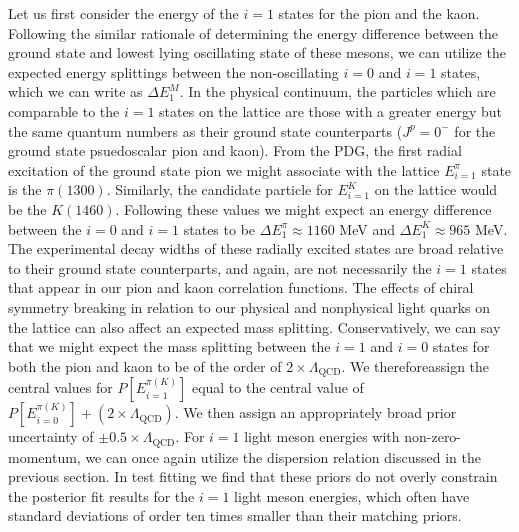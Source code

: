  Let us first consider the energy of the $i=1$ states for the pion and the kaon.  Following the similar rationale of determining the energy difference between the ground state and lowest lying oscillating state of these mesons, we can utilize the expected energy splittings between the non-oscillating $i=0$ and $i=1$ states, which we can write as $\Delta E^M_1$.   In the physical continuum, the particles which are comparable to the $i=1$ states on the lattice are those with a greater energy but the same quantum numbers as their ground state counterparts ($J^p = 0^-$ for the ground state psuedoscalar pion and kaon).  From the PDG, the first radial excitation of the ground state pion we might associate with the lattice $E^\pi_{i=1}$ state is the $\pi(1300)$.  Similarly, the candidate particle for $E^K_{i=1}$ on the lattice would be the $K(1460)$.  Following these values we might expect an energy difference between the $i=0$ and $i=1$ states to be $\Delta E^\pi_1 \approx 1160$ MeV and $\Delta E^K_1 \approx 965$ MeV.  The experimental decay widths of these radially excited states are broad relative to their ground state counterparts, and again, are not necessarily the $i=1$ states that appear in our pion and kaon correlation functions.  The effects of chiral symmetry breaking in relation to our physical and nonphysical light quarks on the lattice can also affect an expected mass splitting.  Conservatively, we can say that we might expect the mass splitting between the $i=1$ and $i=0$ states for both the pion and kaon to be of the order of $2\times\Lambda_\mathrm{QCD}$.  We thereforeassign the central values for $P[E^{\pi(K)}_{i=1}]$ equal to the central value of $P[E^{\pi(K)}_{i=0}] + (2\times\Lambda_\mathrm{QCD})$.  We then assign an appropriately broad prior uncertainty of $\pm0.5\times\Lambda_\mathrm{QCD}$. For $i=1$ light meson energies with non-zero-momentum, we can once again utilize the dispersion relation discussed in the previous section.  In test fitting we find that these priors do not overly constrain the posterior fit results for the $i=1$ light meson energies, which often have standard deviations of order ten times smaller than their matching priors.

